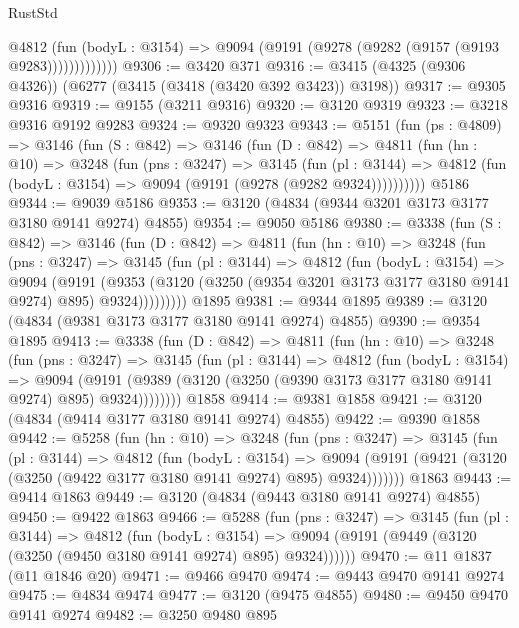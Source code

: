 \begin{lexlean}{RustStd}
\begin{coremodule}
{\begin{coremodule}
{{{{{{{{{{{{{{{{{{{{{{{{{{                @4812
                  (fun (bodyL : @3154) =>
                  @9094 (@9191 (@9278 (@9282 (@9157 (@9193 @9283)))))))))))))
@9306 := @3420 @371
@9316 := @3415 (@4325 (@9306 @4326)) (@6277 (@3415 (@3418 (@3420 @392 @3423)) @3198))
@9317 := @9305 @9316
@9319 := @9155 (@3211 @9316)
@9320 := @3120 @9319
@9323 := @3218 @9316 @9192 @9283
@9324 := @9320 @9323
@9343 := @5151
    (fun (ps : @4809) =>
    @3146
      (fun (S : @842) =>
      @3146
        (fun (D : @842) =>
        @4811
          (fun (hn : @10) =>
          @3248
            (fun (pns : @3247) =>
            @3145
              (fun (pl : @3144) =>
              @4812 (fun (bodyL : @3154) => @9094 (@9191 (@9278 (@9282 @9324))))))))))
    @5186
@9344 := @9039 @5186
@9353 := @3120 (@4834 (@9344 @3201 @3173 @3177 @3180 @9141 @9274) @4855)
@9354 := @9050 @5186
@9380 := @3338
    (fun (S : @842) =>
    @3146
      (fun (D : @842) =>
      @4811
        (fun (hn : @10) =>
        @3248
          (fun (pns : @3247) =>
          @3145
            (fun (pl : @3144) =>
            @4812
              (fun (bodyL : @3154) =>
              @9094
                (@9191
                  (@9353
                    (@3120 (@3250 (@9354 @3201 @3173 @3177 @3180 @9141 @9274) @895) @9324)))))))))
    @1895
@9381 := @9344 @1895
@9389 := @3120 (@4834 (@9381 @3173 @3177 @3180 @9141 @9274) @4855)
@9390 := @9354 @1895
@9413 := @3338
    (fun (D : @842) =>
    @4811
      (fun (hn : @10) =>
      @3248
        (fun (pns : @3247) =>
        @3145
          (fun (pl : @3144) =>
          @4812
            (fun (bodyL : @3154) =>
            @9094
              (@9191 (@9389 (@3120 (@3250 (@9390 @3173 @3177 @3180 @9141 @9274) @895) @9324))))))))
    @1858
@9414 := @9381 @1858
@9421 := @3120 (@4834 (@9414 @3177 @3180 @9141 @9274) @4855)
@9422 := @9390 @1858
@9442 := @5258
    (fun (hn : @10) =>
    @3248
      (fun (pns : @3247) =>
      @3145
        (fun (pl : @3144) =>
        @4812
          (fun (bodyL : @3154) =>
          @9094 (@9191 (@9421 (@3120 (@3250 (@9422 @3177 @3180 @9141 @9274) @895) @9324)))))))
    @1863
@9443 := @9414 @1863
@9449 := @3120 (@4834 (@9443 @3180 @9141 @9274) @4855)
@9450 := @9422 @1863
@9466 := @5288
    (fun (pns : @3247) =>
    @3145
      (fun (pl : @3144) =>
      @4812
        (fun (bodyL : @3154) =>
        @9094 (@9191 (@9449 (@3120 (@3250 (@9450 @3180 @9141 @9274) @895) @9324))))))
@9470 := @11 @1837 (@11 @1846 @20)
@9471 := @9466 @9470
@9474 := @9443 @9470 @9141 @9274
@9475 := @4834 @9474
@9477 := @3120 (@9475 @4855)
@9480 := @9450 @9470 @9141 @9274
@9482 := @3250 @9480 @895
}}}}}}}}}}}}}}}}}}}}}}}}}}
\end{coremodule}}
\end{coremodule}
\end{lexlean}

